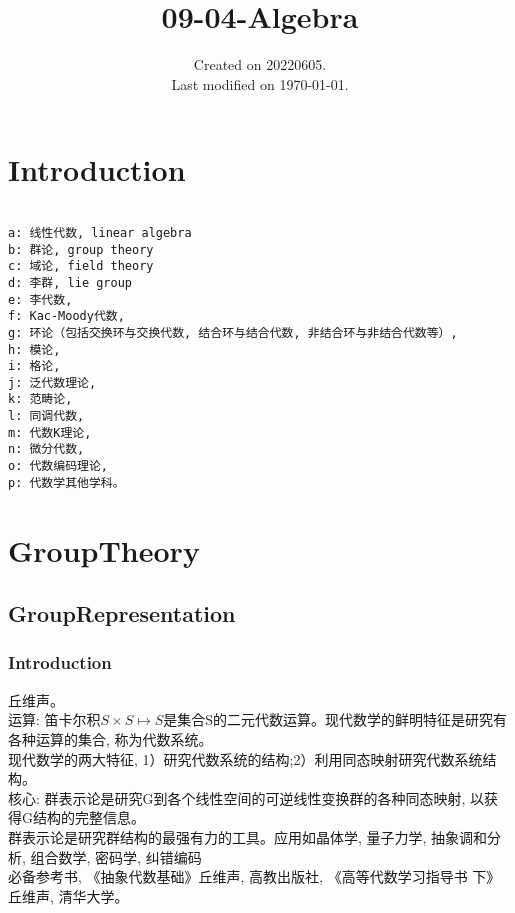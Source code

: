 \documentclass[UTF8]{../09-Mathematics}
\begin{document}
\title{09-04-Algebra}
\date{Created on 20220605.\\   Last modified on \today.}
\maketitle
\tableofcontents


\chapter{Introduction}


\begin{lstlisting}

a: 线性代数, linear algebra
b: 群论, group theory
c: 域论, field theory
d: 李群, lie group
e: 李代数, 
f: Kac-Moody代数, 
g: 环论（包括交换环与交换代数, 结合环与结合代数, 非结合环与非结合代数等）, 
h: 模论, 
i: 格论, 
j: 泛代数理论, 
k: 范畴论, 
l: 同调代数, 
m: 代数K理论, 
n: 微分代数, 
o: 代数编码理论, 
p: 代数学其他学科。

\end{lstlisting}







\chapter{GroupTheory}

\section{GroupRepresentation}

\subsection{Introduction}
丘维声。\\
运算: 笛卡尔积$S \times S \mapsto S$是集合S的二元代数运算。现代数学的鲜明特征是研究有各种运算的集合, 称为代数系统。\\
现代数学的两大特征, 1）研究代数系统的结构;2）利用同态映射研究代数系统结构。\\
核心: 群表示论是研究G到各个线性空间的可逆线性变换群的各种同态映射, 以获得G结构的完整信息。\\
群表示论是研究群结构的最强有力的工具。应用如晶体学, 量子力学, 抽象调和分析, 组合数学, 密码学, 纠错编码\\
必备参考书, 《抽象代数基础》丘维声, 高教出版社, 《高等代数学习指导书 下》丘维声, 清华大学。
\end{document}
